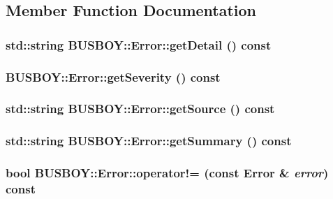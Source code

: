 \subsection{Member Function Documentation}
\hypertarget{classBUSBOY_1_1Error_a9f8d682aa4bd51f2799bafa555f8bed5}{
\subsubsection[{getDetail}]{\setlength{\rightskip}{0pt plus 5cm}std::string BUSBOY::Error::getDetail () const}}
\label{classBUSBOY_1_1Error_a9f8d682aa4bd51f2799bafa555f8bed5}
\hypertarget{classBUSBOY_1_1Error_a97f58492e55ae069c3dfa8f42156715b}{
\subsubsection[{getSeverity}]{ BUSBOY::Error::getSeverity () const}}
\label{classBUSBOY_1_1Error_a97f58492e55ae069c3dfa8f42156715b}
\hypertarget{classBUSBOY_1_1Error_a5fcae27aef82c14a142dfaf50a34fbc7}{
\subsubsection[{getSource}]{\setlength{\rightskip}{0pt plus 5cm}std::string BUSBOY::Error::getSource () const}}
\label{classBUSBOY_1_1Error_a5fcae27aef82c14a142dfaf50a34fbc7}
\hypertarget{classBUSBOY_1_1Error_ae726626acd5ac3bcdcbfcc303d8e79bd}{
\subsubsection[{getSummary}]{\setlength{\rightskip}{0pt plus 5cm}std::string BUSBOY::Error::getSummary () const}}
\label{classBUSBOY_1_1Error_ae726626acd5ac3bcdcbfcc303d8e79bd}
\hypertarget{classBUSBOY_1_1Error_a3e803e02feaf561cab19e946390417a4}{
\subsubsection[{operator!=}]{\setlength{\rightskip}{0pt plus 5cm}bool BUSBOY::Error::operator!= (const {\bf Error} \& {\em error}) const}}
